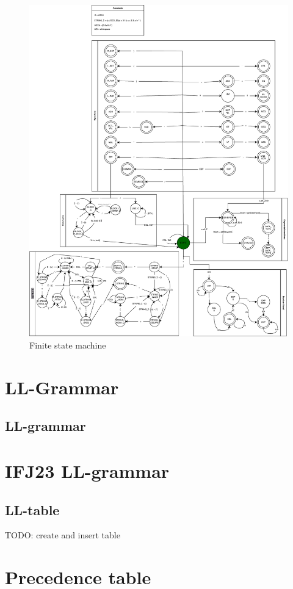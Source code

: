 \documentclass{article}
\begin{document}
\begin{figure}[h]
    \centering
    \includegraphics[scale=0.35]{images/fsm_draft.drawio.png}
    \caption{Finite state machine}
    \label{fig:FSM}
\end{figure}

\newpage

\section{LL-Grammar}
\label{LL-Grammar}


\subsection{LL-grammar}
\label{LL-grammar}

\section*{IFJ23 LL-grammar}

\subsection{LL-table}
\label{LL-table}
TODO: create and insert table

\newpage

\section{Precedence table}
\label{Precedence table}

\newpage
\end{document}
